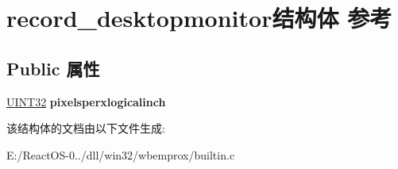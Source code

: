 \hypertarget{structrecord__desktopmonitor}{}\section{record\+\_\+desktopmonitor结构体 参考}
\label{structrecord__desktopmonitor}
\subsection*{Public 属性}
\begin{DoxyCompactItemize}
\item 
\mbox{\label{structrecord__desktopmonitor_ab280c1da05f3465e78924087712119fd}} 
\hyperlink{_processor_bind_8h_ae1e6edbbc26d6fbc71a90190d0266018}{U\+I\+N\+T32} {\bfseries pixelsperxlogicalinch}
\end{DoxyCompactItemize}


该结构体的文档由以下文件生成\+:\begin{DoxyCompactItemize}
\item 
E\+:/\+React\+O\+S-\/0../dll/win32/wbemprox/builtin.\+c\end{DoxyCompactItemize}
